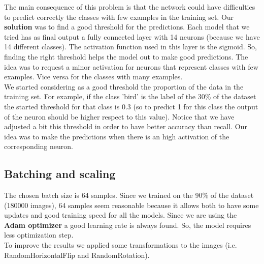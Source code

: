 The main consequence of this problem is that the network could have difficulties to predict correctly the classes with few examples in the training set. Our \textbf{solution} was to find a good threshold for the predictions. Each model that we tried has as final output a fully connected layer with 14 neurons (because we have 14 different classes). The activation function used in this layer is the sigmoid. So, finding the right threshold helps the model out to make good predictions. The idea was to request a minor activation for neurons that represent classes with few examples. Vice versa for the classes with many examples. \\
We started considering as a good threshold the proportion of the data in the training set. For example, if the class 'bird' is the label of the 30\% of the dataset the started threshold for that class is 0.3 (so to predict 1 for this class the output of the neuron should be higher respect to this value). Notice that we have adjusted a bit this threshold in order to have better accuracy than recall. Our idea was to make the predictions when there is an high activation of the corresponding neuron.

\subsection{Batching and scaling}

The chosen batch size is 64 samples. Since we trained on the 90\% of the dataset (180000 images), 64 samples seem reasonable because it allows both to have some updates and good training speed for all the models. Since we are using the \textbf{Adam optimizer} a good learning rate is always found. So, the model requires less optimization step. \\
To improve the results we applied some transformations to the images (i.e. RandomHorizontalFlip and RandomRotation).